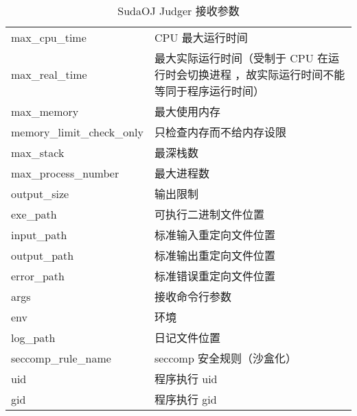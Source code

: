 \begin{table}[h]
\begin{center}
\begin{tabular}{lp{6cm}}
    \toprule
    max\_cpu\_time      & CPU 最大运行时间                                  \\
    max\_real\_time     & 最大实际运行时间（受制于 CPU 在运行时会切换进程%
                          ，故实际运行时间不能等同于程序运行时间）          \\
    max\_memory         & 最大使用内存                                      \\
    memory\_limit\_check\_only & 只检查内存而不给内存设限                   \\
    max\_stack          & 最深栈数                                          \\
    max\_process\_number &  最大进程数                                      \\
    output\_size        & 输出限制                                          \\
    \midrule
    exe\_path           & 可执行二进制文件位置                              \\
    input\_path         & 标准输入重定向文件位置                            \\
    output\_path        & 标准输出重定向文件位置                            \\
    error\_path         & 标准错误重定向文件位置                            \\
    \midrule
    args                & 接收命令行参数                                    \\
    env                 & 环境                                              \\
    \midrule
    log\_path           & 日记文件位置                                      \\
    seccomp\_rule\_name & seccomp 安全规则（沙盒化）                        \\
    \midrule
    uid                 & 程序执行 uid                                      \\
    gid                 & 程序执行 gid                                      \\
    \bottomrule
\end{tabular}
\end{center}
\caption{SudaOJ Judger 接收参数}
\label{sudaoj::judger::args}
\end{table}

